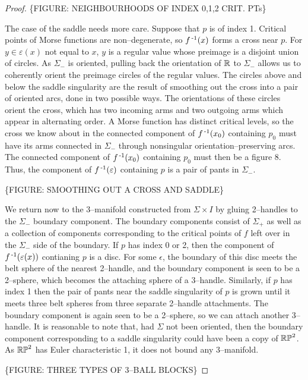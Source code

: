 \begin{proof}
\{FIGURE: NEIGHBOURHOODS OF INDEX 0,1,2 CRIT. PTs\}

The case of the saddle needs more care.
Suppose that $p$ is of index 1.
Critical points of Morse functions are non--degenerate, so $f^{\,\text{-}1} (x)$ forms a cross near $p$.
For $y\in\varepsilon(x)$ not equal to $x$, $y$ is a regular value whose preimage is a disjoint union of circles.
As $\Sigma_-$ is oriented, pulling back the orientation of $\mathbb{R}$ to $\Sigma_-$ allows us to coherently orient the preimage circles of the regular values.
The circles above and below the saddle singularity are the result of smoothing out the cross into a pair of oriented arcs, done in two possible ways.
The orientations of these circles orient the cross, which has two incoming arms and two outgoing arms which appear in alternating order.
A Morse function has distinct critical levels, so the cross we know about in the connected component of $f^{\,\text{-}1}(x_0)$ containing $p_0$ must have its arms connected in $\Sigma_-$ through nonsingular orientation--preserving arcs.
The connected component of $f^{\,\text{-}1}(x_0)$ containing $p_0$ must then be a figure 8.
Thus, the component of $f^{\,\text{-}1}(\varepsilon)$ containing $p$ is a pair of pants in $\Sigma_-$.

\{FIGURE: SMOOTHING OUT A CROSS AND SADDLE\}

We return now to the 3--manifold constructed from $\Sigma\times I$ by gluing 2--handles to the $\Sigma_-$ boundary component.
The boundary components consist of $\Sigma_+$ as well as a collection of components corresponding to the critical points of $f$ left over in the $\Sigma_-$ side of the boundary.
If $p$ has index 0 or 2, then the component of $f^{\,\text{-}1}(\varepsilon(x))$ contianing $p$ is a disc.
For some $\epsilon$, the boundary of this disc meets the belt sphere of the nearest 2--handle, and the boundary component is seen to be a 2--sphere, which becomes the attaching sphere of a 3--handle.
Similarly, if $p$ has index 1 then the pair of pants near the saddle singularity of $p$ is grown until it meets three belt spheres from three separate 2--handle attachments.
The boundary component is again seen to be a 2--sphere, so we can attach another 3--handle.
It is reasonable to note that, had $\Sigma$ not been oriented, then the boundary component corresponding to a saddle singularity could have been a copy of $\mathbb{RP}^2$.
As $\mathbb{RP}^2$ has Euler characteristic 1, it does not bound any 3--manifold.

\{FIGURE: THREE TYPES OF 3--BALL BLOCKS\}


\end{proof}
